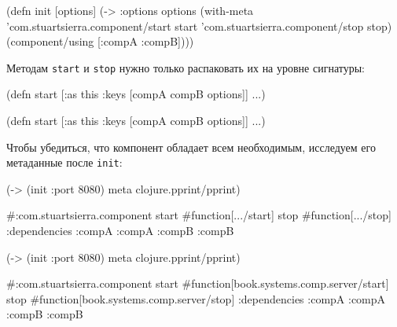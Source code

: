 \else

\begin{english}
  \begin{clojure}
(defn init [options]
  (-> {:options options}
      (with-meta
        {'com.stuartsierra.component/start start
         'com.stuartsierra.component/stop stop})
      (component/using [:compA :compB])))
  \end{clojure}
\end{english}

\fi

\noindent
Методам \verb|start| и \verb|stop| нужно только распаковать их на уровне
сигнатуры:

\ifx\DEVICETYPE\MOBILE

\begin{english}
  \begin{clojure}
(defn start
  [{:as this
    :keys [compA compB options]}]
  ...)
  \end{clojure}
\end{english}

\else

\begin{english}
  \begin{clojure}
(defn start
  [{:as this :keys [compA compB options]}]
  ...)
  \end{clojure}
\end{english}

\fi

Чтобы убедиться, что компонент обладает всем необходимым, исследуем его
метаданные после \verb|init|:

\ifx\DEVICETYPE\MOBILE

\begin{english}
  \begin{clojure}
(-> (init {:port 8080})
    meta
    clojure.pprint/pprint)

#:com.stuartsierra.component
 {start #function[.../start]
  stop  #function[.../stop]
  :dependencies
  {:compA :compA :compB :compB}}
  \end{clojure}
\end{english}

\else

\begin{english}
  \begin{clojure}
(-> (init {:port 8080})
    meta
    clojure.pprint/pprint)

#:com.stuartsierra.component
  {start #function[book.systems.comp.server/start]
   stop #function[book.systems.comp.server/stop]
   :dependencies {:compA :compA :compB :compB}}
  \end{clojure}
\end{english}

